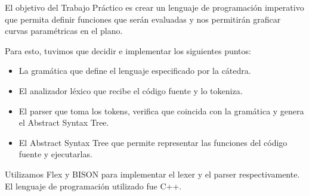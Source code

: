 El objetivo del Trabajo Práctico es crear un lenguaje de programación imperativo que permita definir funciones que serán evaluadas y nos permitirán graficar curvas paramétricas en el plano. 

Para esto, tuvimos que decidir e implementar los siguientes puntos:
\begin{itemize}
\item La gramática que define el lenguaje especificado por la cátedra.
\item El analizador léxico que recibe el código fuente y lo tokeniza.
\item El parser que toma los tokens, verifica que coincida con la gramática y genera el Abstract Syntax Tree.
\item El Abstract Syntax Tree que permite representar las funciones del código fuente y ejecutarlas.
\end{itemize}
Utilizamos Flex y BISON para implementar el lexer y el parser respectivamente. El lenguaje de programación utilizado fue C++.